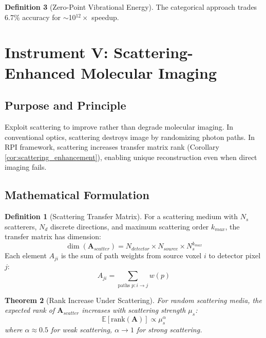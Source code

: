 \documentclass[11pt,a4paper]{article}
\newtheorem{theorem}{Theorem}[section]
\theoremstyle{definition}
\newtheorem{definition}[theorem]{Definition}
\theoremstyle{remark}
\begin{document}
\begin{definition}[Zero-Point Vibrational Energy]
The categorical approach trades 6.7\% accuracy for $\sim$10$^{12}\times$ speedup.

\section{Instrument V: Scattering-Enhanced Molecular Imaging}
\label{sec:instrument5}

\subsection{Purpose and Principle}

Exploit scattering to improve rather than degrade molecular imaging. In conventional optics, scattering destroys image by randomizing photon paths. In RPI framework, scattering increases transfer matrix rank (Corollary \ref{cor:scattering_enhancement}), enabling unique reconstruction even when direct imaging fails.

\subsection{Mathematical Formulation}

\begin{definition}[Scattering Transfer Matrix]
\label{def:scattering_matrix}
For a scattering medium with $N_s$ scatterers, $N_d$ discrete directions, and maximum scattering order $k_{max}$, the transfer matrix has dimension:
\begin{equation}
\dim(\mathbf{A}_{scatter}) = N_{detector} \times N_{source} \times N_s^{k_{max}}
\end{equation}
Each element $A_{ji}$ is the sum of path weights from source voxel $i$ to detector pixel $j$:
\begin{equation}
A_{ji} = \sum_{\text{paths } p:i \to j} w(p)
\end{equation}
\end{definition}

\begin{theorem}[Rank Increase Under Scattering]
\label{thm:rank_increase}
For random scattering media, the expected rank of $\mathbf{A}_{scatter}$ increases with scattering strength $\mu_s$:
\begin{equation}
\mathbb{E}[\text{rank}(\mathbf{A})] \propto \mu_s^{\alpha}
\end{equation}
where $\alpha \approx 0.5$ for weak scattering, $\alpha \to 1$ for strong scattering.
\end{theorem}


\end{definition}
\end{document}
